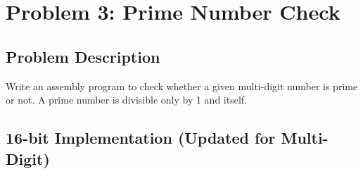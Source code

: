 \documentclass[12pt,a4paper]{article}
\begin{document}
\section{Problem 3: Prime Number Check}

\subsection{Problem Description}
Write an assembly program to check whether a given multi-digit number is prime or not. A prime number is divisible only by 1 and itself.

\subsection{16-bit Implementation (Updated for Multi-Digit)}
\end{document}
